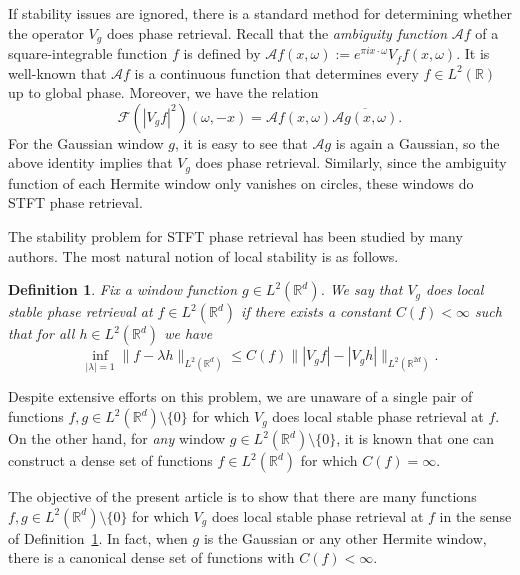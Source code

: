\documentclass[11pt]{amsart}
\newtheorem{definition}[theorem]{Definition}
\theoremstyle{remark}
\begin{document}
If stability issues are ignored, there is a standard method for determining whether the operator $V_g$ does phase retrieval. Recall that the \emph{ambiguity function} $\mathcal{A}f$  of a square-integrable function $f$ is defined by $\mathcal{A}f(x,\omega):=e^{\pi ix\cdot \omega} V_ff(x,\omega)$. It is well-known that $\mathcal{A}f$ is a continuous function that determines every $f\in L^2(\mathbb{R})$ up to global phase. Moreover, we have the relation 
\begin{equation}\label{Ambiguity to STFT}
    \mathcal{F}\left( |V_g f|^2\right)(\omega,-x)=\mathcal{A}f(x,\omega) \overline{\mathcal{A}g(x,\omega)}.
\end{equation}
For the Gaussian window $g$, it is easy to see that $\mathcal{A}g$ is again a Gaussian, so the above identity implies that $V_g$ does phase retrieval. Similarly, since the ambiguity function of each Hermite window only vanishes on circles, these windows do STFT phase retrieval.
 \vspace{0.5em}

The stability problem for STFT phase retrieval has been studied by many authors. The most natural notion of local stability is as follows.
\begin{definition}\label{defn of local stability}
    Fix a window function $g\in L^2(\mathbb{R}^d)$. We say that $V_g$ does \emph{local stable phase retrieval at $f\in L^2(\mathbb{R}^d)$} if there exists a constant $C(f)<\infty$ such that for all $h\in L^2(\mathbb{R}^d)$ we have
    \begin{equation}\label{SPR local V_g}
        \inf_{|\lambda|=1}\|f-\lambda h\|_{L^2(\mathbb{R}^d)}\leq C(f) \| |V_g f|-|V_g h|\|_{L^2(\mathbb{R}^{2d})}.
    \end{equation}
\end{definition}
Despite extensive efforts on this problem, we are unaware of a single pair of functions $f,g\in L^2(\mathbb{R}^d)\setminus\{0\}$ for which $V_g$ does local stable phase retrieval at $f$. On the other hand, for \emph{any} window $g\in L^2(\mathbb{R}^d)\setminus\{0\}$, it is known \cite{alaifari2025cheeger,Alharbi2024Locality} that one can construct a dense set of functions $f\in L^2(\mathbb{R}^d)$ for which $C(f)=\infty$. 
 \vspace{0.5em}

The objective of the present article is to show that there are many functions $f,g\in L^2(\mathbb{R}^d)\setminus\{0\}$ for which $V_g$ does local stable phase retrieval at $f$ in the sense of Definition~\ref{defn of local stability}. In fact, when $g$ is the Gaussian or any other Hermite window, there is a  canonical dense set of functions with $C(f)<\infty.$
\end{document}
